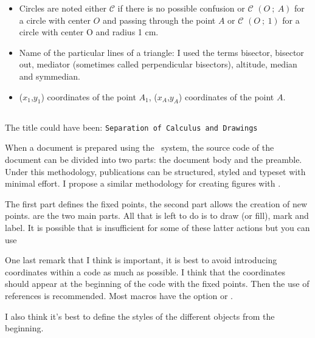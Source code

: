 \begin{itemize}
\item Circles are noted either $\mathcal{C}$ if there is no possible confusion or $\mathcal{C}$ $(O~;~A)$ for a circle with center $O$ and passing through the point $A$ or $\mathcal{C}$ $(O~;~1)$ for a circle with center O and radius 1 cm.

\item  Name of the particular lines of a triangle: I used the terms bisector, bisector out, mediator (sometimes called perpendicular bisectors), altitude, median and symmedian.

\item ($x_1$,$y_1$) coordinates of the point $A_1$, ($x_A$,$y_A$) coordinates of the point $A$.
\end{itemize}

\subsection{}
The title could have been: \texttt{Separation of Calculus and Drawings}

When a document is prepared using the \LATEX\ system, the source code of the document can be divided into two parts: the document body and the preamble.
Under this methodology,  publications can be structured, styled and typeset with minimal effort.
I propose a similar methodology for creating figures with \tkzname{\tkznameofpack}.

The first part defines the fixed points, the second part allows the creation of new points.  are the two main parts. All that is left to do is to draw (or fill), mark and label. It is possible that \tkzname{\tkznameofpack} is insufficient for some of these latter actions but you can use \TIKZ

One last remark that I think is important, it is best to avoid introducing coordinates within a code as much as possible. I think that the coordinates should appear at the beginning of the code with the fixed points. Then the use of references is recommended. Most macros have the option  or .

I also think it's best to define the styles of the different objects from the beginning.
\endinput